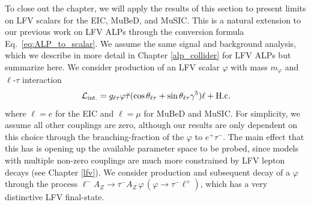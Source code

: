 To close out the chapter, we will apply the results of this section to present limits on LFV scalars for the EIC, MuBeD, and MuSIC. This is a natural extension to our previous work on LFV ALPs \cite{Davoudiasl:2021mjy, Davoudiasl:2024fiz,Batell:2024cdl} through the conversion formula Eq.~\ref{eq:ALP_to_scalar}. We assume the same signal and background analysis, which we describe in more detail in Chapter \ref{alp_collider} for LFV ALPs but summarize here. We consider production of an LFV scalar $\varphi$ with mass $m_\varphi$ and $\ell$-$\tau$ interaction 
\begin{align}
    {\cal L}_{\rm int.} = g_{\ell\tau}\varphi\bar{\tau}(\cos{\theta_{\ell\tau}} + \sin{\theta_{\ell\tau}}\gamma^5)\ell + {\rm H.c.}
\end{align}
where $\ell = e$ for the EIC and $\ell = \mu$ for MuBeD and MuSIC. For simplicity, we assume all other couplings are zero, although our results are only dependent on this choice through the branching-fraction of the $\varphi$ to $e^+\tau^-$. The main effect that this has is opening up the available parameter space to be probed, since models with multiple non-zero couplings are much more constrained by LFV lepton decays (see Chapter \ref{lfv}). We consider production and subsequent decay of a $\varphi$ through the process $\ell^- A_Z \rightarrow \tau^-A_Z \,\varphi\,(\varphi\rightarrow \tau^- \ell^+)$, which has a very distinctive LFV final-state.

